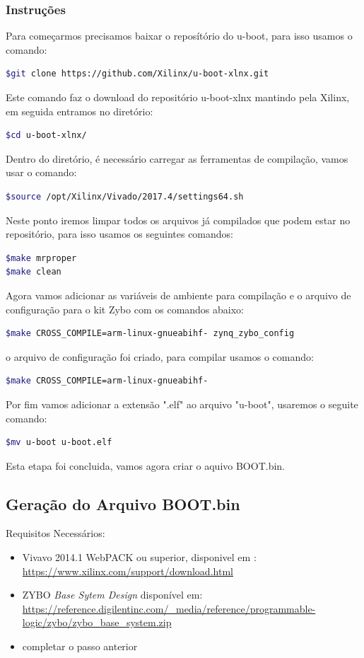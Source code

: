 \begin{anexosenv}
\subsubsection{Instruções}
Para começarmos precisamos baixar o reposítório do u-boot, para isso usamos o comando:
\begin{lstlisting}[language=bash]
$git clone https://github.com/Xilinx/u-boot-xlnx.git
\end{lstlisting}
Este comando faz o download do repositório u-boot-xlnx mantindo pela Xilinx, em seguida entramos no diretório:

\begin{lstlisting}[language=bash]
$cd u-boot-xlnx/
\end{lstlisting}
Dentro do diretório, é necessário carregar as ferramentas de compilação, vamos usar o comando:

\begin{lstlisting}[language=bash]
$source /opt/Xilinx/Vivado/2017.4/settings64.sh
\end{lstlisting}
Neste ponto iremos limpar todos os arquivos já compilados que podem estar no repositório, para isso usamos os seguintes comandos:
\begin{lstlisting}[language=bash]
$make mrproper
$make clean
\end{lstlisting}
Agora vamos adicionar as variáveis de ambiente para compilação e o arquivo de configuração para o kit Zybo com os comandos abaixo:
\begin{lstlisting}[language=bash]
$make CROSS_COMPILE=arm-linux-gnueabihf- zynq_zybo_config
\end{lstlisting}
o arquivo de configuração foi criado, para compilar usamos o comando:
\begin{lstlisting}[language=bash]
$make CROSS_COMPILE=arm-linux-gnueabihf-
\end{lstlisting}
Por fim vamos adicionar a extensão ".elf" ao arquivo "u-boot", usaremos o seguite comando:
\begin{lstlisting}[language=bash]
$mv u-boot u-boot.elf
\end{lstlisting}

Esta etapa foi concluida, vamos agora criar o aquivo BOOT.bin.


 
 

\subsection{Geração do Arquivo BOOT.bin}
Requisitos Necessários:
\begin{itemize}
\item Vivavo 2014.1 WebPACK ou superior, disponivel em : \url{https://www.xilinx.com/support/download.html}
\item ZYBO \textit{Base Sytem Design}  disponível em: \url{https://reference.digilentinc.com/_media/reference/programmable-logic/zybo/zybo_base_system.zip}
\item completar o passo anterior


\end{itemize}
\end{anexosenv}
